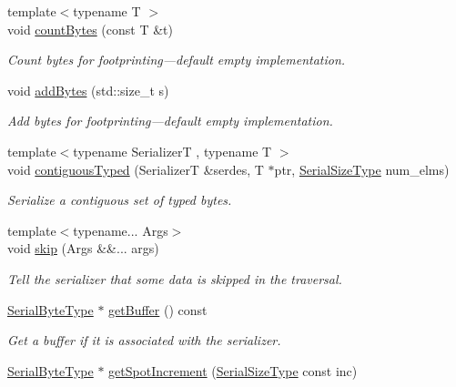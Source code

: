 \begin{DoxyCompactItemize}
{\footnotesize template$<$typename T $>$ }\\void \hyperlink{structcheckpoint_1_1_serializer_a805ae9ce395614512dfb6b0bd2c22881}{count\+Bytes} (const T \&t)
\begin{DoxyCompactList}\small\item\em Count bytes for footprinting---default empty implementation. \end{DoxyCompactList}\item 
void \hyperlink{structcheckpoint_1_1_serializer_a52cd27806c3b821605d723900ec7d2e5}{add\+Bytes} (std\+::size\+\_\+t s)
\begin{DoxyCompactList}\small\item\em Add bytes for footprinting---default empty implementation. \end{DoxyCompactList}\item 
{\footnotesize template$<$typename SerializerT , typename T $>$ }\\void \hyperlink{structcheckpoint_1_1_serializer_af2f453fc63424918a16ea6024d576a3e}{contiguous\+Typed} (SerializerT \&serdes, T $\ast$ptr, \hyperlink{namespacecheckpoint_a083f6674da3f94c2901b18c6d238217c}{Serial\+Size\+Type} num\+\_\+elms)
\begin{DoxyCompactList}\small\item\em Serialize a contiguous set of typed bytes. \end{DoxyCompactList}\item 
{\footnotesize template$<$typename... Args$>$ }\\void \hyperlink{structcheckpoint_1_1_serializer_ae0224c5bad49a1bd2af178987adb84f9}{skip} (Args \&\&... args)
\begin{DoxyCompactList}\small\item\em Tell the serializer that some data is skipped in the traversal. \end{DoxyCompactList}\item 
\hyperlink{namespacecheckpoint_ae57f01cdc0b81776c23b6c7c934c58f5}{Serial\+Byte\+Type} $\ast$ \hyperlink{structcheckpoint_1_1_serializer_a6231bd380e02ee8668e7a6efebca2664}{get\+Buffer} () const
\begin{DoxyCompactList}\small\item\em Get a buffer if it is associated with the serializer. \end{DoxyCompactList}\item 
\hyperlink{namespacecheckpoint_ae57f01cdc0b81776c23b6c7c934c58f5}{Serial\+Byte\+Type} $\ast$ \hyperlink{structcheckpoint_1_1_serializer_af2fc82901c31232b7549b20a8732de30}{get\+Spot\+Increment} (\hyperlink{namespacecheckpoint_a083f6674da3f94c2901b18c6d238217c}{Serial\+Size\+Type} const inc)

\end{DoxyCompactItemize}
